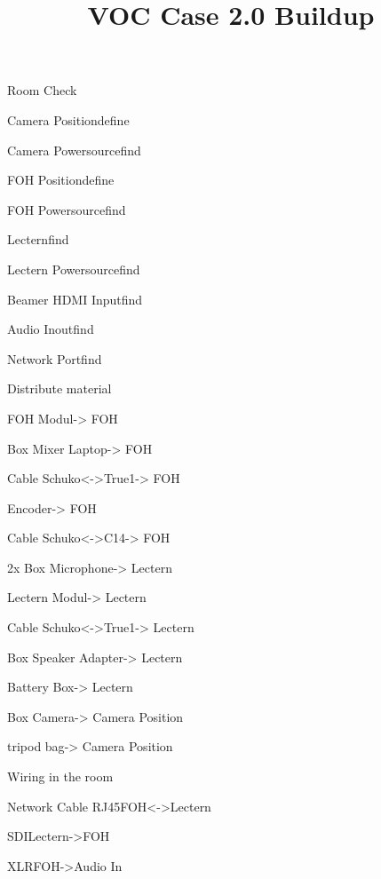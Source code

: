 \def\papersize{4}




\title{VOC Case 2.0 Buildup}

\begin{checklist}{Room Check}
  \item{Camera Position}{define}
  \item{Camera Powersource}{find}
  \item{FOH Position}{define}
  \item{FOH Powersource}{find}
  \item{Lectern}{find}
  \item{Lectern Powersource}{find}
  \item{Beamer HDMI Input}{find}
  \item{Audio Inout}{find}
  \item{Network Port}{find}
\end{checklist}

\begin{checklist}{Distribute material}
  \item{FOH Modul}{-> FOH}
  \item{Box Mixer Laptop}{-> FOH}
  \item{Cable Schuko<->True1}{-> FOH}
    \item{Encoder}{-> FOH}
    \item{Cable Schuko<->C14}{-> FOH}
  \item{2x Box Microphone}{-> Lectern}
  \item{Lectern Modul}{-> Lectern}
  \item{Cable Schuko<->True1}{-> Lectern}
  \item{Box Speaker Adapter}{-> Lectern}
  \item{Battery Box}{-> Lectern}
  \item{Box Camera}{-> Camera Position}
  \item{tripod bag}{-> Camera Position}
\end{checklist}

\begin{checklist}{Wiring in the room}
  \item{Network Cable RJ45}{FOH<->Lectern}
  \item{SDI}{Lectern->FOH}
  \item{XLR}{FOH->Audio In}
\end{checklist}

